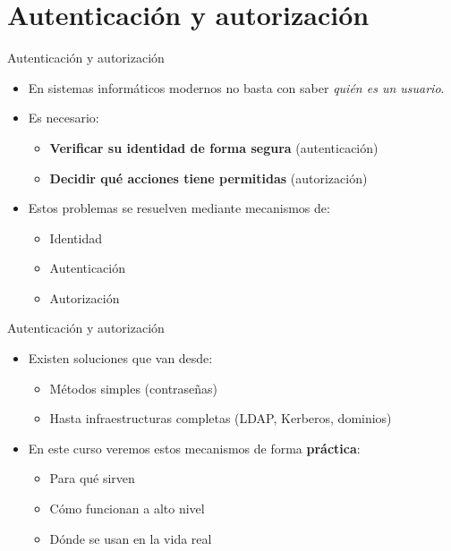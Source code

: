 \documentclass{beamer}
\begin{document}
\section{Autenticación y autorización}

\begin{frame}{Autenticación y autorización}
\begin{itemize}
  \item En sistemas informáticos modernos no basta con saber \textit{quién es un usuario}.
  \item Es necesario:
  \begin{itemize}
    \item \textbf{Verificar su identidad de forma segura} (autenticación)
    \item \textbf{Decidir qué acciones tiene permitidas} (autorización)
  \end{itemize}
  \item Estos problemas se resuelven mediante mecanismos de:
  \begin{itemize}
    \item Identidad
    \item Autenticación
    \item Autorización
  \end{itemize}
\end{itemize}
\end{frame}

\begin{frame}{Autenticación y autorización}
\begin{itemize}
  \item Existen soluciones que van desde:
  \begin{itemize}
    \item Métodos simples (contraseñas)
    \item Hasta infraestructuras completas (LDAP, Kerberos, dominios)
  \end{itemize}
  \item En este curso veremos estos mecanismos de forma \textbf{práctica}:
  \begin{itemize}
    \item Para qué sirven
    \item Cómo funcionan a alto nivel
    \item Dónde se usan en la vida real
  \end{itemize}
\end{itemize}
\end{frame}
\end{document}
